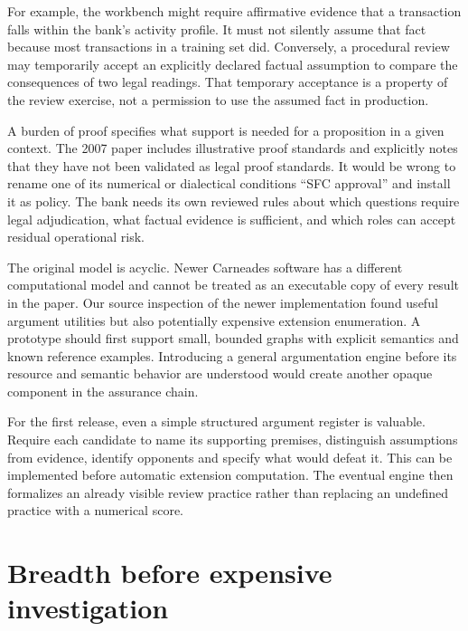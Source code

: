 For example, the workbench might require affirmative evidence that a transaction
falls within the bank's activity profile. It must not silently assume that fact
because most transactions in a training set did. Conversely, a procedural review
may temporarily accept an explicitly declared factual assumption to compare the
consequences of two legal readings. That temporary acceptance is a property of
the review exercise, not a permission to use the assumed fact in production.


A burden of proof specifies what support is needed for a proposition in a given
context. The 2007 paper includes illustrative proof standards and explicitly
notes that they have not been validated as legal proof standards. It would be
wrong to rename one of its numerical or dialectical conditions ``SFC approval''
and install it as policy. The bank needs its own reviewed rules about which
questions require legal adjudication, what factual evidence is sufficient, and
which roles can accept residual operational risk.

The original model is acyclic. Newer Carneades software has a different
computational model and cannot be treated as an executable copy of every result
in the paper. Our source inspection of the newer implementation found useful
argument utilities but also potentially expensive extension enumeration. A
prototype should first support small, bounded graphs with explicit semantics and
known reference examples. Introducing a general argumentation engine before its
resource and semantic behavior are understood would create another opaque
component in the assurance chain.

For the first release, even a simple structured argument register is valuable.
Require each candidate to name its supporting premises, distinguish assumptions
from evidence, identify opponents and specify what would defeat it. This can be
implemented before automatic extension computation. The eventual engine then
formalizes an already visible review practice rather than replacing an undefined
practice with a numerical score.

\section{Breadth before expensive investigation}
\label{merge:M05:06}


